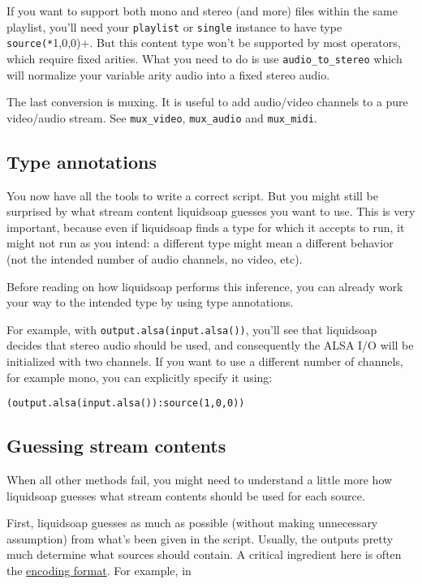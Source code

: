 If you want to support both mono and stereo (and more) files within
the same playlist, you'll need your \verb+playlist+
or \verb+single+ instance to have type
\verb+source(*+1,0,0)+.
But this content type won't be supported by most operators, which
require fixed arities. What you need to do is use \verb+audio_to_stereo+
which will normalize your variable arity audio into a fixed stereo audio.

The last conversion is muxing.
It is useful to add audio/video channels to a pure video/audio stream.
See \verb+mux_video+, \verb+mux_audio+ and \verb+mux_midi+.

\subsection{Type annotations}
You now have all the tools to write a correct script.
But you might still be surprised by what stream content liquidsoap
guesses you want to use.
This is very important, because even if liquidsoap finds a type
for which it accepts to run, it might not run as you intend:
a different type might mean a different behavior
(not the intended number of audio channels, no video, etc).

Before reading on how liquidsoap performs this inference,
you can already work your way to the intended type by using type
annotations.

For example, with \verb+output.alsa(input.alsa())+,
you'll see that liquidsoap decides that stereo audio should be used,
and consequently the ALSA I/O will be initialized with two channels.
If you want to use a different number of channels,
for example mono, you can explicitly specify it using:

\begin{verbatim}
(output.alsa(input.alsa()):source(1,0,0))
\end{verbatim}
\subsection{Guessing stream contents}
When all other methods fail, you might need to understand a little more
how liquidsoap guesses what stream contents should be used for
each source.

First, liquidsoap guesses as much as possible
(without making unnecessary assumption) from what's been given in the
script.
Usually, the outputs pretty much determine what sources should contain.
A critical ingredient here is often the
\href{encoding_formats.html}{encoding format}. For example, in

